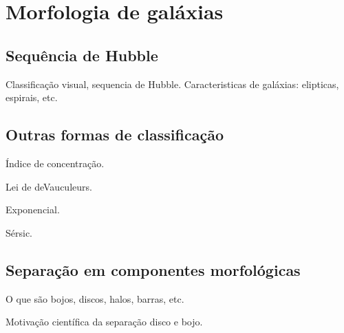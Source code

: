 


\chapter{Morfologia de galáxias}
\label{sec:morph}


\section{Sequência de Hubble}

\TODO Classificação visual, sequencia de Hubble. Caracteristicas de galáxias:
elipticas, espirais, etc.

\section{Outras formas de classificação}

Índice de concentração.

Lei de deVauculeurs.

Exponencial.

Sérsic.

\section{Separação em componentes morfológicas}

O que são bojos, discos, halos, barras, etc.

Motivação científica da separação disco e bojo.


